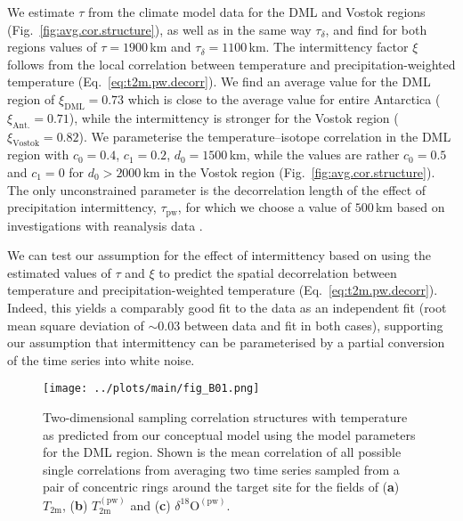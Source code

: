 \documentclass[cp, manuscript]{copernicus}
\begin{document}
We estimate $\tau$ from the climate model data for the DML and Vostok regions
(Fig.~\ref{fig:avg.cor.structure}), as well as in the same way
$\tau_{\delta}$, and find for both regions values of $\tau=1900$\,km and
$\tau_{\delta}=1100$\,km. The intermittency factor $\xi$ follows from the
local correlation between temperature and precipitation-weighted temperature
(Eq.~\ref{eq:t2m.pw.decorr}). We find an average value for the DML region of
$\xi_{\mathrm{DML}}=0.73$ which is close to the average value for entire
Antarctica ($\xi_{\mathrm{Ant.}}=0.71$), while the intermittency is stronger for
the Vostok region ($\xi_{\mathrm{Vostok}}=0.82$). We parameterise the
temperature--isotope correlation in the DML region with $c_0=0.4$, $c_1=0.2$,
$d_0=1500$\,km, while the values are rather $c_0=0.5$ and $c_1=0$ for
$d_0>2000$\,km in the Vostok region (Fig.~\ref{fig:avg.cor.structure}). The only
unconstrained parameter is the decorrelation length of the effect of
precipitation intermittency, $\tau_{\mathrm{pw}}$, for which we choose a value
of $500$\,km based on investigations with reanalysis data \citep{Munch2018a}.

We can test our assumption for the effect of intermittency based on using the
estimated values of $\tau$ and $\xi$ to predict the spatial decorrelation
between temperature and precipitation-weighted temperature
(Eq.~\ref{eq:t2m.pw.decorr}). Indeed, this yields a comparably good fit to the
data as an independent fit (root mean square deviation of $\sim0.03$ between
data and fit in both cases), supporting our assumption that intermittency can be
parameterised by a partial conversion of the time series into white noise.

\begin{figure*}[t]%
\centering
\texttt{[image: ../plots/main/fig\_B01.png]}
\caption{%
  Two-dimensional sampling correlation structures with temperature as predicted
  from our conceptual model using the model parameters for the DML region. Shown
  is the mean correlation of all possible single correlations from averaging two
  time series sampled from a pair of concentric rings around the target site for
  the fields of (\textbf{a}) $T_{\mathrm{2m}}$, (\textbf{b})
  $T_{\mathrm{2m}}^{\mathrm{(pw)}}$ and (\textbf{c})
  $\delta^{18}\mathrm{O}^{\mathrm{(pw)}}$.}
\label{fig:conceptual.model}%
\end{figure*}%
\end{document}
